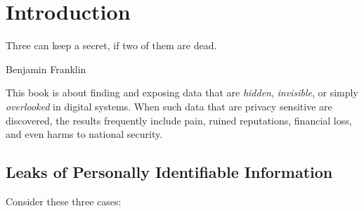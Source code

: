 \chapter{Introduction}\label{ch:introduction}
\setlength{\epigraphwidth}{3in}
\epigraph{Three can keep a secret, if two of them are dead.}{Benjamin
  Franklin}

This book is about finding and exposing data that are \emph{hidden},
\emph{invisible}, or simply \emph{overlooked} in digital systems. When
such data that are privacy sensitive are discovered, the results
frequently include pain, ruined
reputations, financial loss, and even harms to national
security. 

\section{Leaks of Personally Identifiable Information}

Consider these three cases:

